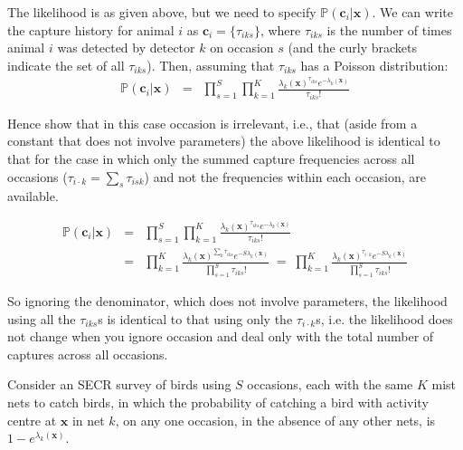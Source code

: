 \begin{questions}
\begin{parts}
{\begin{solution}
The likelihood is as given above, but we need to specify $\mathbb{P}(\mathbf{c}_i|\mathbf{x})$. We can write the capture history for animal $i$ as $\mathbf{c}_i=\{\tau_{iks}\}$, where $\tau_{iks}$ is the number of times animal $i$ was detected by detector $k$ on occasion $s$ (and the curly brackets indicate the set of all $\tau_{iks}$). Then, assuming that $\tau_{iks}$ has a Poisson distribution:
\begin{eqnarray}
\mathbb{P}(\mathbf{c}_i|\mathbf{x})&=&\prod_{s=1}^S\prod_{k=1}^K\frac{\lambda_k(\mathbf{x})^{\tau_{iks}}e^{-\lambda_k(\mathbf{x})}}{\tau_{iks}!} \nonumber
\end{eqnarray}
\end{solution}}

\item Hence show that in this case occasion is irrelevant, i.e., that (aside from a constant that does not involve parameters) the above likelihood is identical to that for the case in which only the summed capture frequencies across all occasions ($\tau_{i\cdot k}=\sum_s\tau_{isk}$) and not the frequencies within each occasion, are available.

{\begin{solution}
\begin{eqnarray}
\mathbb{P}(\mathbf{c}_i|\mathbf{x})&=&\prod_{s=1}^S\prod_{k=1}^K\frac{\lambda_k(\mathbf{x})^{\tau_{iks}}e^{-\lambda_k(\mathbf{x})}}{\tau_{iks}!} \nonumber \\
&=&\prod_{k=1}^K\frac{\lambda_k(\mathbf{x})^{\sum_k\tau_{iks}}e^{-S\lambda_k(\mathbf{x})}}{\prod_{s=1}^S\tau_{iks}!}
\;=\;\prod_{k=1}^K\frac{\lambda_k(\mathbf{x})^{\tau_{i\cdot k}}e^{-S\lambda_k(\mathbf{x})}}{\prod_{s=1}^S\tau_{iks}!} \nonumber
\end{eqnarray}

So ignoring the denominator, which does not involve parameters, the likelihood using all the $\tau_{iks}$s is identical to that using only the $\tau_{i\cdot k}$s, i.e. the likelihood does not change when you ignore occasion and deal only with the total number of captures across all occasions.

\end{solution}}

\end{parts}

\item Consider an SECR survey of birds using $S$ occasions, each with the same $K$ mist nets to catch birds, in which the probability of catching a bird with activity centre at $\mathbf{x}$ in net $k$, on any one occasion, in the absence of any other nets, is $1-e^{\lambda_k(\mathbf{x})}$.


\end{questions}
